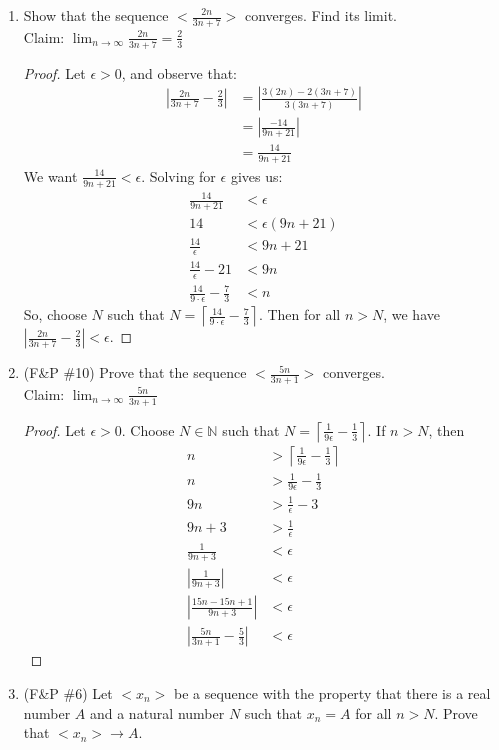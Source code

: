 \documentclass{article}
\theoremstyle{problem}
\theoremstyle{plain}
\theoremstyle{remark}
\newcommand{\ceil}[1] {
  \left\lceil #1 \right\rceil
}
\newcommand{\abs}[1] {
  \left| #1 \right|
}
\begin{document}
\begin{enumerate}
\item Show that the sequence $<\frac{2n}{3n+7}>$ converges. Find its limit.\\
  Claim: $\displaystyle \lim_{n \to \infty} \frac{2n}{3n+7} = \frac{2}{3}$\\[.5cm]
  \begin{proof}
  Let $\epsilon > 0$, and observe that:
  \begin{align*}
    \left|\frac{2n}{3n+7} - \frac{2}{3}\right| &= 
    \left|\frac{3(2n) - 2(3n + 7)}{3(3n + 7)}\right|\\
    &= \left|\frac{-14}{9n+21}\right|\\
    &= \frac{14}{9n+21}
  \end{align*}
  We want $\displaystyle \frac{14}{9n+21} < \epsilon$. Solving for $\epsilon$ gives us:
  \begin{align*}
    \displaystyle \frac{14}{9n+21} &< \epsilon\\
    14 &< \epsilon(9n + 21)\\
    \frac{14}{\epsilon} &< 9n + 21\\
    \frac{14}{\epsilon} - 21 &< 9n\\
    \frac{14}{9 \cdot \epsilon} - \frac{7}{3} &< n
  \end{align*}
  So, choose $N$ such that $N = \displaystyle \left\lceil \frac{14}{9 \cdot \epsilon} - \frac{7}{3} \right\rceil$. Then for all $n > N$, we have $\displaystyle \left|\frac{2n}{3n+7} - \frac{2}{3}\right| < \epsilon$.
\end{proof}

\item (F\&P \#10) Prove that the sequence $<\frac{5n}{3n+1}>$ converges. \\
  Claim: $\displaystyle \lim_{n \to \infty} \frac{5n}{3n+1}$
  \begin{proof}
    Let $\epsilon > 0$. Choose $N \in \mathbb{N}$ such that $N = \displaystyle \ceil{\frac{1}{9\epsilon} - \frac{1}{3}}$. If $n > N$, then    
    \begin{align*}
      n &> \ceil{\frac{1}{9\epsilon} - \frac{1}{3}}\\
      n &> \frac{1}{9\epsilon} - \frac{1}{3}\\
      9n &> \frac{1}{\epsilon} - 3\\
      9n + 3 &> \frac{1}{\epsilon}\\
      \frac{1}{9n+3} &< \epsilon\\
      \abs{\frac{1}{9n+3}} &< \epsilon\\
      \abs{\frac{15n - 15n + 1}{9n+3}} &< \epsilon\\
      \abs{\frac{5n}{3n+1} - \frac{5}{3}} &< \epsilon
    \end{align*}
\end{proof}
\item (F\&P \#6) Let $<x_n>$ be a sequence with the property that there is a real number $A$ and a natural number $N$ such that $x_n = A$ for all $n > N$. Prove that $<x_n> \to A$.


\end{enumerate}
\end{document}
